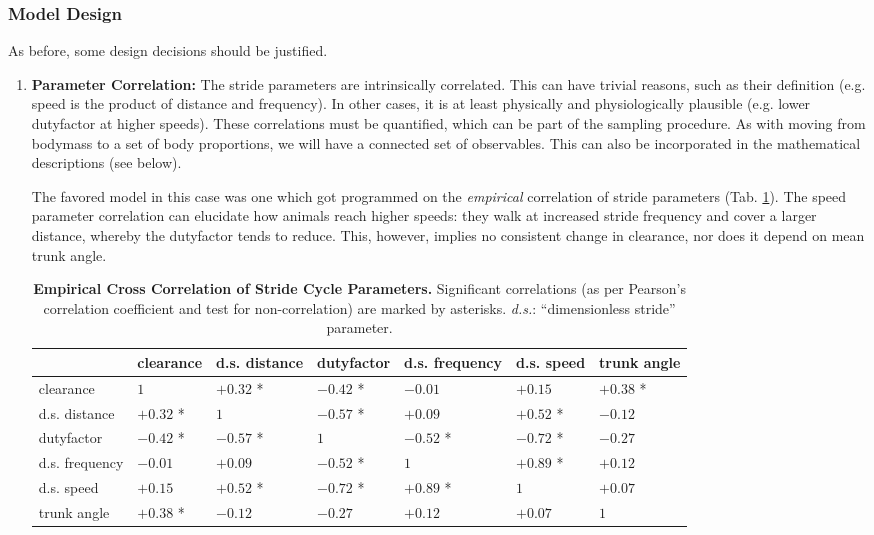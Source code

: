 \subsubsection{Model Design}
\label{sec:org554cfcf}
As before, some design decisions should be justified.

\begin{enumerate}
\item \textbf{Parameter Correlation:}
\label{sec:orgccc0e5d}
The stride parameters are intrinsically correlated.
This can have trivial reasons, such as their definition (e.g. speed is the product of distance and frequency).
In other cases, it is at least physically and physiologically plausible (e.g. lower dutyfactor at higher speeds).
These correlations must be quantified, which can be part of the sampling procedure.
As with moving from bodymass to a set of body proportions, we will have a connected set of observables.
This can also be incorporated in the mathematical descriptions (see below).

The favored model in this case was one which got programmed on the \emph{empirical} correlation of stride parameters (Tab. \ref{tab:stridecorrelation}).
The speed parameter correlation can elucidate how animals reach higher speeds: they walk at increased stride frequency and cover a larger distance, whereby the dutyfactor tends to reduce.
This, however, implies no consistent change in clearance, nor does it depend on mean trunk angle.

\begin{table}[htbp]
\caption{\label{tab:stridecorrelation}\textbf{Empirical Cross Correlation of Stride Cycle Parameters.} Significant correlations (as per Pearson's correlation coefficient and test for non-correlation) are marked by asterisks. \emph{d.s.}: ``dimensionless stride'' parameter.}
\centering
\begin{tabular}{lllllll}
 & clearance & d.s. distance & dutyfactor & d.s. frequency & d.s. speed & trunk angle\\[0pt]
\hline
clearance & \(1\) & \(+0.32\) * & \(-0.42\) * & \(-0.01\) & \(+0.15\) & \(+0.38\) *\\[0pt]
d.s. distance & \(+0.32\) * & \(1\) & \(-0.57\) * & \(+0.09\) & \(+0.52\) * & \(-0.12\)\\[0pt]
dutyfactor & \(-0.42\) * & \(-0.57\) * & \(1\) & \(-0.52\) * & \(-0.72\) * & \(-0.27\)\\[0pt]
d.s. frequency & \(-0.01\) & \(+0.09\) & \(-0.52\) * & \(1\) & \(+0.89\) * & \(+0.12\)\\[0pt]
d.s. speed & \(+0.15\) & \(+0.52\) * & \(-0.72\) * & \(+0.89\) * & \(1\) & \(+0.07\)\\[0pt]
trunk angle & \(+0.38\) * & \(-0.12\) & \(-0.27\) & \(+0.12\) & \(+0.07\) & \(1\)\\[0pt]
\end{tabular}
\end{table}




\end{enumerate}

